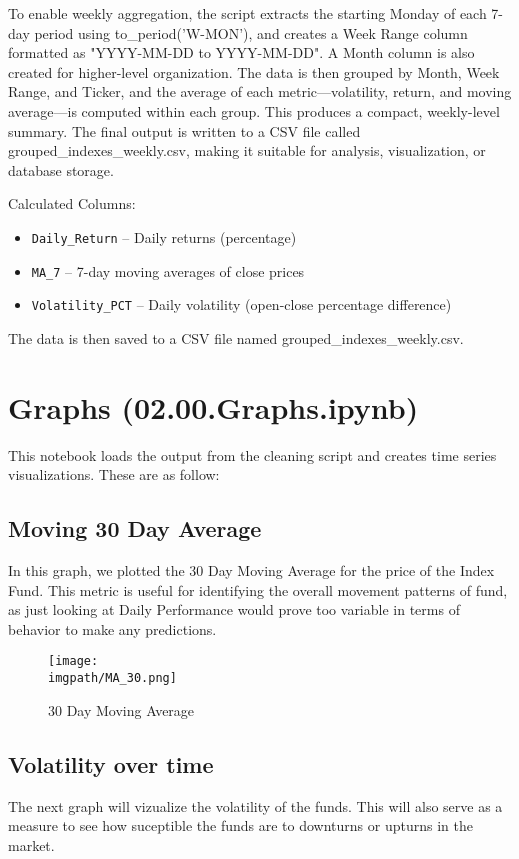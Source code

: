 \documentclass[12pt]{article}
\newcommand{\imgpath}{C:/Career Projects/Index Predictions/Outputs/Images}
\begin{document}
To enable weekly aggregation, the script extracts the starting Monday of each 7-day period using to\_period('W-MON'), and creates a Week Range column formatted as "YYYY-MM-DD to YYYY-MM-DD". A Month column is also created for higher-level organization. The data is then grouped by Month, Week Range, and Ticker, and the average of each metric—volatility, return, and moving average—is computed within each group. This produces a compact, weekly-level summary. The final output is written to a CSV file called grouped\_indexes\_weekly.csv, making it suitable for analysis, visualization, or database storage.

Calculated Columns:

\begin{itemize}
\item \texttt{Daily\_Return} – Daily returns (percentage)
\item \texttt{MA\_7} – 7-day moving averages of close prices
\item \texttt{Volatility\_PCT} – Daily volatility (open-close percentage difference)
\end{itemize}

The data is then saved to a CSV file named grouped\_indexes\_weekly.csv.

\section{Graphs (02.00.Graphs.ipynb)}
This notebook loads the output from the cleaning script and creates time series visualizations. These are as follow:

\subsection{Moving 30 Day Average} 
In this graph, we plotted the 30 Day Moving Average for the price of the Index Fund. This metric is useful for identifying the overall movement patterns of fund, as just looking at Daily Performance would prove too variable in terms of behavior to make any predictions.

\begin{figure}[h]
    \centering
    \texttt{[image: \\imgpath/MA\_30.png]} 
    \caption{30 Day Moving Average}
    \label{fig:MA_30}
\end{figure}

\subsection{Volatility over time}
The next graph will vizualize the volatility of the funds. This will also serve as a measure to see how suceptible the funds are to downturns or upturns in the market.
\end{document}
